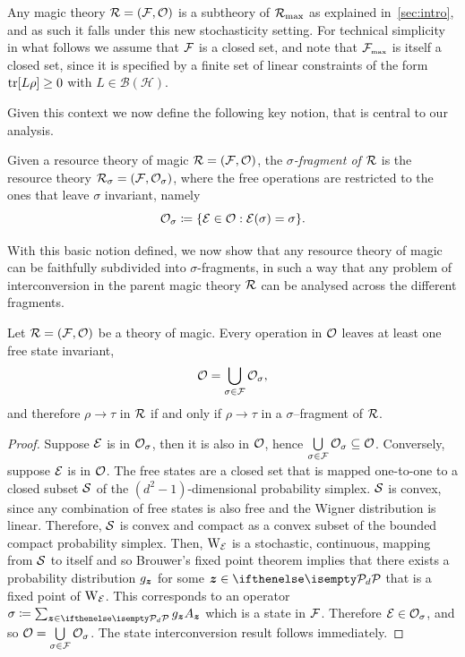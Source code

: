 \documentclass[pra,
aps,
twocolumn,
superscriptaddress,
groupedaddress,
nofootinbib,
reprint
]{revtex4-1}
\begin{document}
Any magic theory $\R = (\F, \O)$ is a subtheory of $\Rmax$ as explained in~\cref{sec:intro}, and as such it falls under this new stochasticity setting. For technical simplicity in what follows we assume that $\F$ is a closed set, and note that $\F_{\mbox{\tiny max}}$ is itself a closed set, since it is specified by a finite set of linear constraints of the form $\tr [ L\rho] \ge 0$ with $L \in \mathcal{B}(\mathcal{H})$.


Given this context we now define the following key notion, that is central to our analysis.
\begin{definition}\label{def:sigmafrag}
   Given a resource theory of magic $\R = (\F, \O)$, the \emph{$\sigma$-fragment of $\R$} is the resource theory $\R_\sigma = (\F, \O_\sigma)$, where the free operations are restricted to the ones that leave $\sigma$ invariant, namely
    \begin{equation}
        \O_\sigma \coloneqq \{ \E \in \O: \E(\sigma) = \sigma \}.
    \end{equation}
\end{definition}

With this basic notion defined, we now show that any resource theory of magic can be faithfully subdivided into $\sigma$-fragments, in such a way that any problem of interconversion in the parent magic theory $\R$ can be analysed across the different fragments.

\begin{theorem}
    Let $\R = (\F, \O)$ be a theory of magic.
    Every operation in $\O$ leaves at least one free state invariant,
  \begin{equation}
\O = \bigcup\limits_{\sigma \in \F} \O_\sigma, 
\end{equation}
and therefore $\rho\longrightarrow \tau$ in $\R$ if and only if $\rho\longrightarrow \tau$ in a $\sigma$--fragment of $\R$.
\end{theorem}
\begin{proof}
    Suppose $\E$ is in $\O_\sigma$, then it is also in $\O$, hence $\bigcup\limits_{\sigma \in \F} \O_\sigma \subseteq \O$. Conversely, suppose $\E$ is in $\O$. 
    The free states are a closed set that is mapped one-to-one to a closed subset $\cal{S}$ of the $(d^2 - 1)$-dimensional probability simplex.
    $\cal{S}$ is convex, since any combination of free states is also free and the Wigner distribution is linear.
    Therefore, $\cal{S}$ is convex and compact as a convex subset of the bounded compact probability simplex.
    Then, $\W{\E}{}$ is a stochastic, continuous, mapping from $\cal{S}$ to itself and so Brouwer's fixed point theorem  implies that there exists a probability distribution $g_{\bmz}$ for some $ \bmz \in \pd$ that is a fixed point of $\W{\E}{}$.
    This corresponds to an operator $\sigma \coloneqq \sum_{\bmz \in \pd} g_{\bmz} A_{\bmz}$  which is a state in $\F$. Therefore $\E \in \O_\sigma$, and so $\O = \bigcup\limits_{\sigma \in \F} \O_\sigma$. The state interconversion result follows immediately.
\end{proof}
\end{document}
